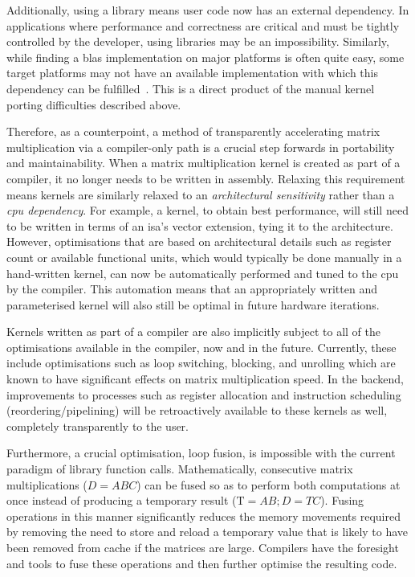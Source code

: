 \documentclass[\main/thesis.tex]{subfiles}
\begin{document}
Additionally, using a library means user code now has an external dependency.
In applications where performance and correctness are critical and must be tightly controlled by the developer, using libraries may be an impossibility.
Similarly, while finding a \gls{blas} implementation on major platforms is often quite easy, some target platforms may not have an available implementation with which this dependency can be fulfilled~\autocite{zee2016blis}.
This is a direct product of the manual kernel porting difficulties described above.

Therefore, as a counterpoint, a method of transparently accelerating matrix multiplication via a compiler-only path is a crucial step forwards in portability and maintainability.
When a matrix multiplication kernel is created as part of a compiler, it no longer needs to be written in assembly.
Relaxing this requirement means kernels are similarly relaxed to an \emph{architectural sensitivity} rather than a \emph{\gls{cpu} dependency}.
For example, a kernel, to obtain best performance, will still need to be written in terms of an \gls{isa}'s vector extension, tying it to the architecture.
However, optimisations that are based on architectural details such as register count or available functional units, which would typically be done manually in a hand-written kernel, can now be automatically performed and tuned to the \gls{cpu} by the compiler.
This automation means that an appropriately written and parameterised kernel will also still be optimal in future hardware iterations.

Kernels written as part of a compiler are also implicitly subject to all of the optimisations available in the compiler, now and in the future.
Currently, these include optimisations such as loop switching, blocking, and unrolling which are known to have significant effects on matrix multiplication speed.
In the backend, improvements to processes such as register allocation and instruction scheduling (reordering/pipelining) will be retroactively available to these kernels as well, completely transparently to the user.

Furthermore, a crucial optimisation, loop fusion, is impossible with the current paradigm of library function calls.
Mathematically, consecutive matrix multiplications (\eg $D = ABC$) can be fused so as to perform both computations at once instead of producing a temporary result (\ie $\text{T}=AB;D=TC$).
Fusing operations in this manner significantly reduces the memory movements required by removing the need to store and reload a temporary value that is likely to have been removed from cache if the matrices are large.
Compilers have the foresight and tools to fuse these operations and then further optimise the resulting code.
\end{document}

